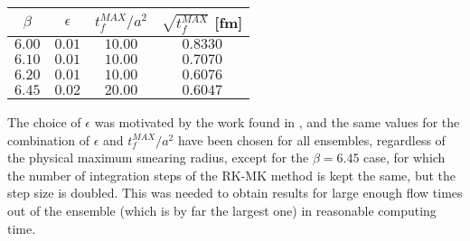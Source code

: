 \begin{table}[!htb]
    \begin{center}
    \begin{tabular}{cccc} 
        $\beta$ & $\epsilon$ & $t_f^{MAX}/a^2$ & $\sqrt{t_f^{MAX}}$ [fm] \\\hline
        $6.00$ & $0.01$ & $10.00$ & $0.8330$ \\
        $6.10$ & $0.01$ & $10.00$ & $0.7070$ \\
        $6.20$ & $0.01$ & $10.00$ & $0.6076$ \\
        $6.45$ & $0.02$ & $20.00$ & $0.6047$ 
    \end{tabular}
    \label{runs:flow} 
    \end{center}
\end{table}
The choice of $\epsilon$ was motivated by the work found in \cite{ce_testing_2015}, and the same values for the combination of $\epsilon$ and $t_f^{MAX}/a^2$ have been chosen for all ensembles, regardless of the physical maximum smearing radius, except for the $\beta=6.45$ case, for which the number of integration steps of the RK-MK method is kept the same, but the step size is doubled. This was needed to obtain results for large enough flow times out of the ensemble (which is by far the largest one) in reasonable computing time.


